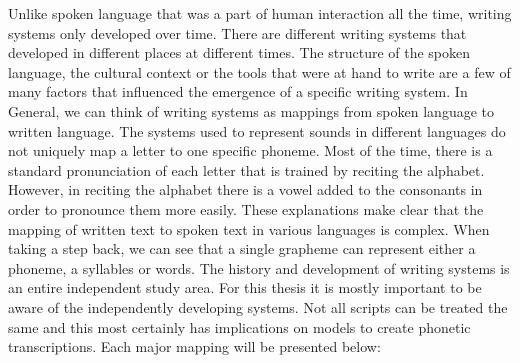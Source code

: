 Unlike spoken language that was a part of human interaction all the time, writing systems only developed over time. There are different writing systems that developed in different places at different times. The structure of the spoken language, the cultural context or the tools that were at hand to write are a few of many factors that influenced the emergence of a specific writing system. In General, we can think of writing systems as mappings from spoken language to written language. The systems used to represent sounds in different languages do not uniquely map a letter to one specific phoneme. Most of the time, there is a standard pronunciation of each letter that is trained by reciting the alphabet. However, in reciting the alphabet there is a vowel added to the consonants in order to pronounce them more easily. These explanations make clear that the mapping of written text to spoken text in various languages is complex. When taking a step back, we can see that a single grapheme can represent either a phoneme, a syllables or words. The history and development of writing systems is an entire independent study area. For this thesis it is mostly important to be aware of the independently developing systems. Not all scripts can be treated the same and this most certainly has implications on models to create phonetic transcriptions. Each major mapping will be presented below: 

